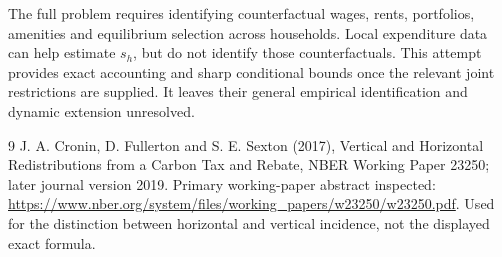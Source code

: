 \documentclass[11pt]{article}
\begin{document}
The full problem requires identifying counterfactual wages, rents, portfolios, amenities and equilibrium selection across households. Local expenditure data can help estimate $s_h$, but do not identify those counterfactuals. This attempt provides exact accounting and sharp conditional bounds once the relevant joint restrictions are supplied. It leaves their general empirical identification and dynamic extension unresolved.

\begin{thebibliography}{9}
 J. A. Cronin, D. Fullerton and S. E. Sexton (2017), Vertical and Horizontal Redistributions from a Carbon Tax and Rebate, NBER Working Paper 23250; later journal version 2019. Primary working-paper abstract inspected: \url{https://www.nber.org/system/files/working_papers/w23250/w23250.pdf}. Used for the distinction between horizontal and vertical incidence, not the displayed exact formula.
\end{thebibliography}
\end{document}
